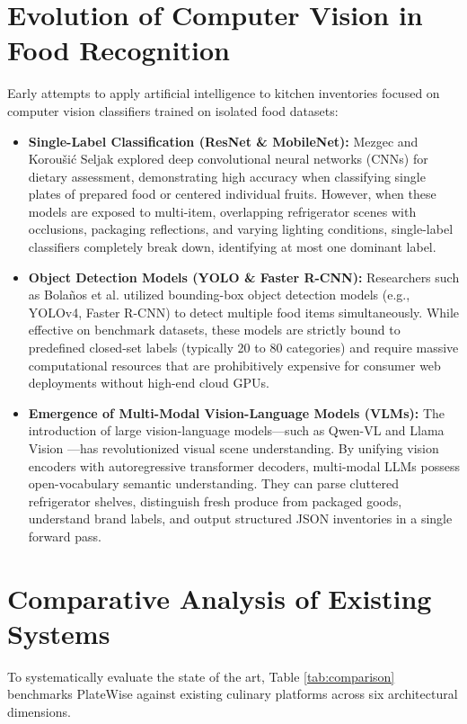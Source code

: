 \section{Evolution of Computer Vision in Food Recognition}
Early attempts to apply artificial intelligence to kitchen inventories focused on computer vision classifiers trained on isolated food datasets:
\begin{itemize}
    \item \textbf{Single-Label Classification (ResNet \& MobileNet):} Mezgec and Korou\v{s}i\'{c} Seljak \cite{mezgec2017nutrinet} explored deep convolutional neural networks (CNNs) for dietary assessment, demonstrating high accuracy when classifying single plates of prepared food or centered individual fruits. However, when these models are exposed to multi-item, overlapping refrigerator scenes with occlusions, packaging reflections, and varying lighting conditions, single-label classifiers completely break down, identifying at most one dominant label.
    \item \textbf{Object Detection Models (YOLO \& Faster R-CNN):} Researchers such as Bola\~{n}os et al. \cite{bolanos2017simultaneous} utilized bounding-box object detection models (e.g., YOLOv4, Faster R-CNN) to detect multiple food items simultaneously. While effective on benchmark datasets, these models are strictly bound to predefined closed-set labels (typically 20 to 80 categories) and require massive computational resources that are prohibitively expensive for consumer web deployments without high-end cloud GPUs.
    \item \textbf{Emergence of Multi-Modal Vision-Language Models (VLMs):} The introduction of large vision-language models—such as Qwen-VL \cite{bai2023qwen} and Llama Vision \cite{dubey2024llama}—has revolutionized visual scene understanding. By unifying vision encoders with autoregressive transformer decoders, multi-modal LLMs possess open-vocabulary semantic understanding. They can parse cluttered refrigerator shelves, distinguish fresh produce from packaged goods, understand brand labels, and output structured JSON inventories in a single forward pass.
\end{itemize}

\section{Comparative Analysis of Existing Systems}
To systematically evaluate the state of the art, Table \ref{tab:comparison} benchmarks PlateWise against existing culinary platforms across six architectural dimensions.

